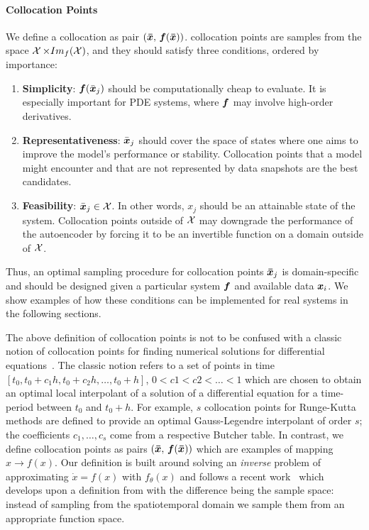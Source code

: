 \paragraph{Collocation Points}
\label{sec:collocations_conditions} We define a collocation as pair $(\boldsymbol{\bar{x}},\, \boldsymbol{f}(\boldsymbol{\bar{x}}))$. collocation points are samples from the space $\operatorname{\mathcal{X}} \times Im_{f}(\operatorname{\mathcal{X}})$, and they should satisfy three conditions, ordered by importance:
\begin{enumerate}
    \item \textbf{Simplicity}: $\boldsymbol{f}(\bar{\boldsymbol{x}}_j)$ should be computationally cheap to evaluate. It is especially important for PDE systems, where $\boldsymbol{f}$ may involve high-order derivatives.
    \item \textbf{Representativeness}: $\bar{\boldsymbol{x}}_j$ should cover the space of states where one aims to improve the model's performance or stability. Collocation points that a model might encounter and that are not represented by data snapshots are the best candidates.
    \item \textbf{Feasibility}: $\bar{\boldsymbol{x}}_j \in \operatorname{\mathcal{X}}$. In other words, $x_j$ should be an attainable state of the system. Collocation points outside of $\operatorname{\mathcal{X}}$ may downgrade the performance of the autoencoder by forcing it to be an invertible function on a domain outside of $\operatorname{\mathcal{X}}$.
\end{enumerate}
Thus, an optimal sampling procedure for collocation points $\boldsymbol{\bar{x}}_j$ is domain-specific and should be designed given a particular system $\boldsymbol{f}$ and available data $\boldsymbol{x}_i$. We show examples of how these conditions can be implemented for real systems in the following sections.

The above definition of collocation points is not to be confused with a classic notion of collocation points for finding numerical solutions for differential equations~\citep{fornberg1998practical, trefethen2022numerical}. The classic notion refers to a set of points in time $[t_0, t_0 + c_1h, t_0 + c_2h, \dots, t_0 + h]$, $0 < c1 < c2 < \dots < 1$ which are chosen to obtain an optimal local interpolant of a solution of a differential equation for a time-period between $t_0$ and $t_0 + h$. For example, $s$ collocation points for Runge-Kutta methods are defined to provide an optimal Gauss-Legendre interpolant of order $s$; the coefficients $c_1, \dots, c_s$ come from a respective Butcher table. In contrast, we define collocation points as pairs $(\boldsymbol{\bar{x}},\, \boldsymbol{f}(\boldsymbol{\bar{x}}))$ which are  examples of mapping $x \to f(x)$. Our definition is built around solving an \textit{inverse} problem of approximating $\dot{x} = f(x)$ with $f_\theta(x)$ and follows a recent work~\citep{liu2022physics} which develops upon a definition from \citep{raissi2018hidden} with the difference being the sample space: instead of sampling from the spatiotemporal domain we sample them from an appropriate function space.

